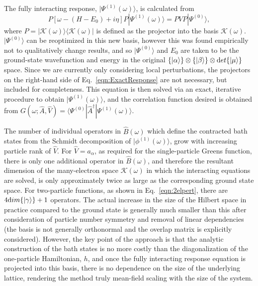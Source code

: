 \documentclass[aps,showpacs,twocolumn,nobibnotes]{revtex4}
\begin{document}
The fully interacting response, $|\Psi^{(1)}(\omega) \rangle$, is calculated from
\begin{equation}
    P \left[ \omega - (H-E_0) + i \eta \right] P | \Psi^{(1)}(\omega) \rangle = P V P |\Psi^{(0)} \rangle   ,   \label{eqn:ExactResponse}
\end{equation}
where $P=|\mathcal{K}(\omega) \rangle \langle \mathcal{K}(\omega) |$ is defined as the projector into the basis $\mathcal{K}(\omega)$. 
$|\Psi^{(0)} \rangle$ can be reoptimized in this new basis, however this was found empirically not to qualitatively change results, and 
so $|\Psi^{(0)}\rangle$ and $E_0$ are taken to be the ground-state wavefunction and energy in the 
original $\{|\alpha \rangle \} \otimes \{ |\beta \rangle \} \otimes {\textrm det} \{ | \mu \rangle \} $ space. 
Since we are currently only considering local perturbations,
the projectors on the right-hand side of Eq.~\ref{eqn:ExactResponse} are not necessary, but included for completeness.
This equation is then solved via an exact, iterative procedure to obtain $| \Psi^{(1)}(\omega) \rangle$, and the correlation function desired is obtained from 
$G(\omega;{\hat A},{\hat V})=\langle \Psi^{(0)} | {\hat A}^{\dagger} | \Psi^{(1)}(\omega) \rangle$.

The number of individual operators in ${\hat B}(\omega)$ which define the contracted bath states from the Schmidt decomposition 
of $|\phi^{(1)}(\omega) \rangle$, grow with increasing particle rank of ${\hat V}$. For ${\hat V}=a_{\alpha}$, as required for the single-particle Greens function,
there is only one additional operator in ${\hat B}(\omega)$, and therefore the resultant dimension of the many-electron space $\mathcal{K}(\omega)$ in 
which the interacting equations are solved, is only approximately twice as large as the corresponding ground state space. For two-particle functions,
as shown in Eq.~\ref{eqn:2elpert}, there are $4 {\textrm dim}\{|\gamma \rangle \} + 1$ operators. The actual increase in the size of the Hilbert
space in practice compared to the ground state is generally much smaller than this after consideration of particle number symmetry and removal of linear
dependencies (the basis is not generally orthonormal and the overlap matrix is explicitly considered). However, the key point of the 
approach is that the analytic construction of the bath states is no more costly than the diagonalization of the one-particle Hamiltonian, $h$, and once the
fully interacting response equation is projected into this basis, there is no dependence on the size of the underlying lattice, rendering the method
truly mean-field scaling with the size of the system. 
\end{document}
